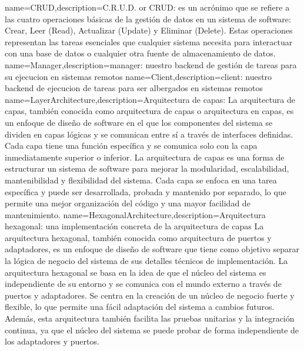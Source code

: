 
 {name={CRUD},description={C.R.U.D. or CRUD: es un acrónimo que se refiere a las cuatro operaciones básicas de la gestión de datos en un sistema de software: Crear, Leer (Read), Actualizar (Update) y Eliminar (Delete). Estas operaciones representan las tareas esenciales que cualquier sistema necesita para interactuar con una base de datos o cualquier otra fuente de almacenamiento de datos.}}
 {name={Manager},description={manager: nuestro backend de gestión de tareas para su ejecucion en sistemas remotos}}
 {name={Client},description={client: nuestro backend de ejecucion de tareas para ser albergados en sistemas remotos}}
 {name={LayerArchitecture},description={Arquitectura de capas: La arquitectura de capas, también conocida como arquitectura de capas o arquitectura en capas, es un enfoque de diseño de software en el que los componentes del sistema se dividen en capas lógicas y se comunican entre sí a través de interfaces definidas. Cada capa tiene una función específica y se comunica solo con la capa inmediatamente superior o inferior. La arquitectura de capas es una forma de estructurar un sistema de software para mejorar la modularidad, escalabilidad, mantenibilidad y flexibilidad del sistema. Cada capa se enfoca en una tarea específica y puede ser desarrollada, probada y mantenido por separado, lo que permite una mejor organización del código y una mayor facilidad de mantenimiento.}}
 {name={HexagonalArchitecture},description={Arquitectura hexagonal: una implementación concreta de la arquitectura de capas La arquitectura hexagonal, también conocida como arquitectura de puertos y adaptadores, es un enfoque de diseño de software que tiene como objetivo separar la lógica de negocio del sistema de sus detalles técnicos de implementación. La arquitectura hexagonal se basa en la idea de que el núcleo del sistema es independiente de su entorno y se comunica con el mundo externo a través de puertos y adaptadores. Se centra en la creación de un núcleo de negocio fuerte y flexible, lo que permite una fácil adaptación del sistema a cambios futuros. Además, esta arquitectura también facilita las pruebas unitarias y la integración continua, ya que el núcleo del sistema se puede probar de forma independiente de los adaptadores y puertos.}}
